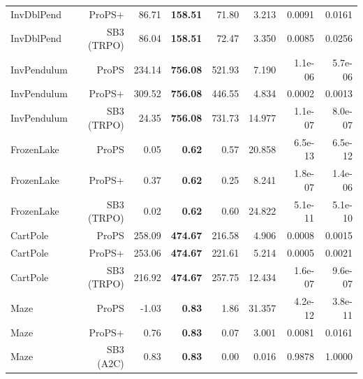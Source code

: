 \begin{tabular}{@{}lrrrrrrr@{}}
InvDblPend & ProPS+ & 86.71 & \cellcolor{bestcolor}\textbf{158.51} & 71.80 & 3.213 & 0.0091 & 0.0161 \\
InvDblPend & SB3 (TRPO) & 86.04 & \cellcolor{bestcolor}\textbf{158.51} & 72.47 & 3.350 & 0.0085 & 0.0256 \\
InvPendulum & ProPS & 234.14 & \cellcolor{bestcolor}\textbf{756.08} & 521.93 & 7.190 & 1.1e-06 & 5.7e-06 \\
InvPendulum & ProPS+ & 309.52 & \cellcolor{bestcolor}\textbf{756.08} & 446.55 & 4.834 & 0.0002 & 0.0013 \\
InvPendulum & SB3 (TRPO) & 24.35 & \cellcolor{bestcolor}\textbf{756.08} & 731.73 & 14.977 & 1.1e-07 & 8.0e-07 \\
FrozenLake & ProPS & 0.05 & \cellcolor{bestcolor}\textbf{0.62} & 0.57 & 20.858 & 6.5e-13 & 6.5e-12 \\
FrozenLake & ProPS+ & 0.37 & \cellcolor{bestcolor}\textbf{0.62} & 0.25 & 8.241 & 1.8e-07 & 1.4e-06 \\
FrozenLake & SB3 (TRPO) & 0.02 & \cellcolor{bestcolor}\textbf{0.62} & 0.60 & 24.822 & 5.1e-11 & 5.1e-10 \\
CartPole & ProPS & 258.09 & \cellcolor{bestcolor}\textbf{474.67} & 216.58 & 4.906 & 0.0008 & 0.0015 \\
CartPole & ProPS+ & 253.06 & \cellcolor{bestcolor}\textbf{474.67} & 221.61 & 5.214 & 0.0005 & 0.0021 \\
CartPole & SB3 (TRPO) & 216.92 & \cellcolor{bestcolor}\textbf{474.67} & 257.75 & 12.434 & 1.6e-07 & 9.6e-07 \\
Maze & ProPS & -1.03 & \cellcolor{bestcolor}\textbf{0.83} & 1.86 & 31.357 & 4.2e-12 & 3.8e-11 \\
Maze & ProPS+ & 0.76 & \cellcolor{bestcolor}\textbf{0.83} & 0.07 & 3.001 & 0.0081 & 0.0161 \\
Maze & SB3 (A2C) & 0.83 & \cellcolor{bestcolor}\textbf{0.83} & 0.00 & 0.016 & 0.9878 & 1.0000 \\
\bottomrule
\end{tabular}
